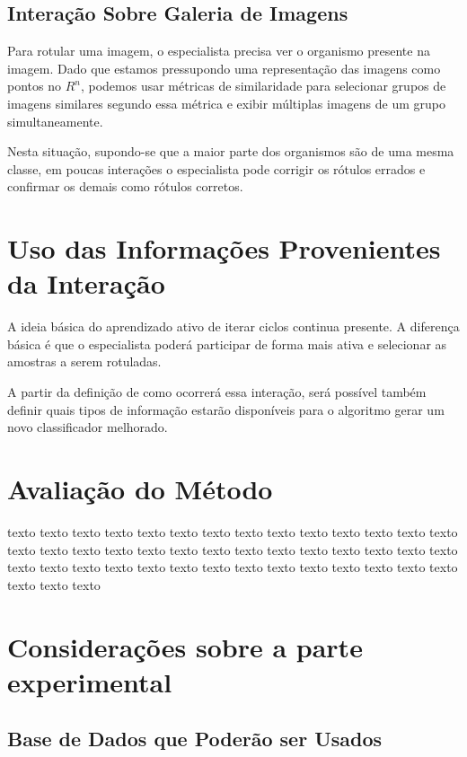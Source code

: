 \subsection{Interação Sobre Galeria de Imagens} 
\label{sec:galeria_imagens}

Para rotular uma imagem, o especialista precisa ver o organismo presente na imagem. Dado que estamos pressupondo uma representação  das imagens como pontos no $R^
n$, podemos usar métricas de similaridade para selecionar grupos de imagens similares segundo essa métrica e exibir múltiplas imagens de um grupo simultaneamente.
 
Nesta situação, supondo-se que a maior parte dos organismos são de uma mesma classe, em poucas interações o especialista pode corrigir os rótulos errados e confirmar os demais como rótulos corretos.


\section{Uso das Informações Provenientes da Interação}
\label{sec:uso_das_informacoes_interacao}

A ideia básica do aprendizado ativo de iterar ciclos continua presente. A diferença básica é que o especialista poderá participar de forma mais ativa e selecionar as amostras a serem rotuladas.

A partir da definição de como ocorrerá essa interação, será possível também definir quais tipos de informação estarão disponíveis para o algoritmo gerar um novo classificador melhorado.



\section{Avaliação do Método}
\label{sec:avaliação do método}

texto texto texto texto texto texto texto texto texto texto texto texto texto texto texto texto texto texto texto texto texto texto texto texto texto texto texto texto texto texto texto texto texto texto texto texto texto texto texto texto texto texto texto texto texto 

\section{Considerações sobre a parte experimental}
\label{sec:consideracoes_parte_experimental}


\subsection{Base de Dados que Poderão ser Usados} 
\label{sec:base_usadas}

